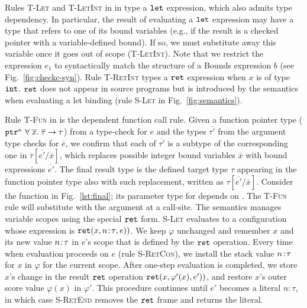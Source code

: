 {
%
Rules \textsc{T-Let} and \textsc{T-LetInt} in in  type a $\mathtt{let}$ expression, which also admits
type dependency. 
In particular, the result of evaluating a $\mathtt{let}$ expression
may have a type that refers to one of its bound variables (e.g., if
the result is a checked pointer with a variable-defined bound). 
If so, we must substitute away this variable once it goes out of scope (\textsc{T-LetInt}). 
Note that we restrict the expression $e_1$ to syntactically match the
structure of a Bounds expression $b$ (see Fig.~\ref{fig:checkc-syn}).
Rule \textsc{T-RetInt} types a $\mathtt{ret}$ expression when $x$ is of type $\mathtt{int}$.
$\mathtt{ret}$ does not appear in source programs but is introduced by the semantics when
evaluating a let binding (rule \textsc{S-Let} in
Fig.~\ref{fig:semantics}). 

Rule \textsc{T-Fun} in  is the dependent function call rule. 
Given a function pointer type ($\mathtt{ptr}^{\kappa}~{\forall \;\overline{x}.\;{\overline{\tau}}\to\tau}$)
from a type-check for $e$ and the types $\overline{\tau'}$ from the argument type checks for $\overline{e}$,
we confirm that each of $\overline{\tau'}$ is
a subtype of the corresponding one in $\overline{\tau}[\overline{e'} / \overline{x}]$,
which replaces possible integer bound variables $\overline{x}$ with bound expressions $\overline{e'}$.
The final result type is the defined target type $\tau$ appearing in the function pointer type
also with such replacement, written as $\tau[\overline{e'} / \overline{x}]$.
Consider the  function in
Fig.~\ref{lst:final}; its parameter type for  
depends on . The \textsc{T-Fun} rule will substitute 
 with the argument at a call-site.
The semantics manages variable scopes using the special $\mathtt{ret}$
form. \textsc{S-Let} evaluates to a configuration whose expression is
$\mathtt{ret}({x},{{n}\!:\!{\tau}},{e}))$. We keep $\varphi$ unchanged
and remember $x$ and its new value ${n}\!:\!{\tau}$
in $e$'s scope that is defined by the $\mathtt{ret}$ operation.
Every time when evaluation proceeds on $e$ (rule \textsc{S-RetCon}),
we install the stack value ${n}\!:\!{\tau}$ for $x$ in $\varphi$ for the current scope.
After one-step evaluation is completed, 
we store $x$'s change in the result $\mathtt{ret}$ operation $\mathtt{ret}({x},{\varphi'(x)},{e'}))$,
and restore $x$'s outer score value $\varphi(x)$ in $\varphi'$. 
This procedure continues until $e'$ becomes a literal
$n\!:\!\tau$, in which case \textsc{S-RetEnd} removes the $\mathtt{ret}$ frame and returns
the literal. 

}
